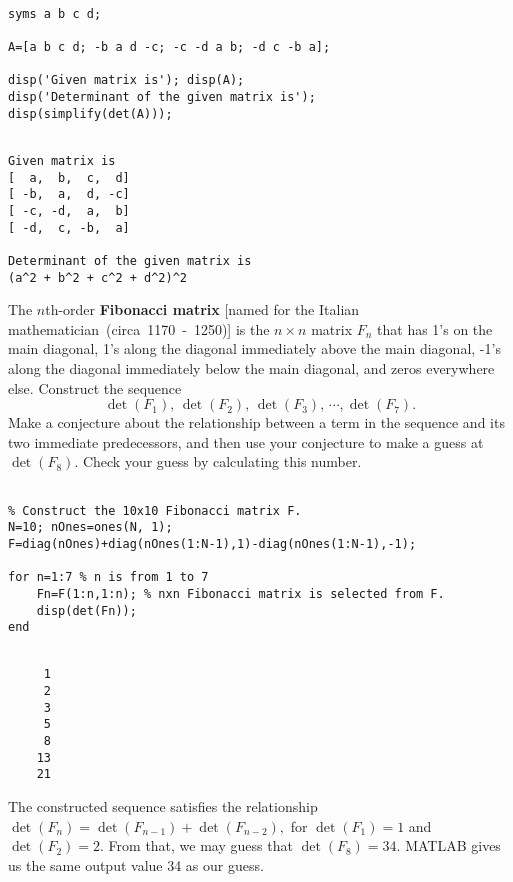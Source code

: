 \begin{sol}

\begin{verbatim}

syms a b c d;

A=[a b c d; -b a d -c; -c -d a b; -d c -b a];

disp('Given matrix is'); disp(A);
disp('Determinant of the given matrix is'); 
disp(simplify(det(A)));
\end{verbatim}

\begin{outputs}
\begin{verbatim}

Given matrix is
[  a,  b,  c,  d]
[ -b,  a,  d, -c]
[ -c, -d,  a,  b]
[ -d,  c, -b,  a]
 
Determinant of the given matrix is
(a^2 + b^2 + c^2 + d^2)^2
\end{verbatim}
\end{outputs}
\end{sol}

\vspace{3mm}


\begin{exer} 
The $n$th-order \textbf{Fibonacci matrix} [named for the Italian mathematician~(circa~1170~-~1250)] is the $n \times n$ matrix $F_{n}$ that has 1's on the main diagonal, 1's along the diagonal immediately above the main diagonal, -1's along the diagonal immediately below the main diagonal, and zeros everywhere else. Construct the sequence
$$\det(F_{1}), \,\det(F_{2}), \,\det(F_{3}), \,\cdots, \det(F_{7}).$$
Make a conjecture about the relationship between a term in the sequence and its two immediate predecessors, and then use your conjecture to make a guess at $\det(F_{8})$. Check your guess by calculating this number.
\end{exer}

\begin{sol}
\begin{verbatim}

% Construct the 10x10 Fibonacci matrix F.
N=10; nOnes=ones(N, 1);
F=diag(nOnes)+diag(nOnes(1:N-1),1)-diag(nOnes(1:N-1),-1);

for n=1:7 % n is from 1 to 7
    Fn=F(1:n,1:n); % nxn Fibonacci matrix is selected from F. 
    disp(det(Fn));
end
\end{verbatim}

\begin{outputs}
\begin{verbatim}

     1
     2
     3
     5
     8
    13
    21
\end{verbatim}
\end{outputs}

\noindent The constructed sequence satisfies the relationship $\det(F_n)=\det(F_{n-1})+\det(F_{n-2}),$ for $\det(F_1)=1$ and $\det(F_2)=2$. From that, we may guess that $\det(F_8)=34$.
MATLAB gives us the same output value 34 as our guess. 
\end{sol}

